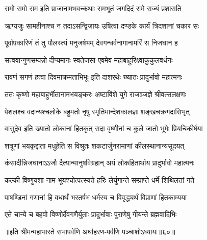 \twolineshloka
{रामो रामो राम इति प्राजानामभवन्कथाः}
{रामभूतं जगदिदं रामे राज्यं प्रशासति}


\twolineshloka
{ऋग्यजुः सामहीनाश्च न तदाऽसन्द्विजायः}
{उषित्वा दण्डके कार्यं त्रिदशानां चकार सः}


\twolineshloka
{पूर्वापकारिणं तं तु पौलस्त्यं मनुजर्षभम्}
{देवगन्धर्वनागानामरिं स निजघान ह}


\twolineshloka
{सत्ववान्गुणसम्पन्नो दीप्यमानः स्वतेजसा}
{एवमेव महाबाहुरिक्ष्वाकुकुलवर्धनः}


\twolineshloka
{रावणं सगणं हत्वा दिवमाक्रमताभिभूः}
{इति दाशरथेः ख्यातः प्रादुर्भावो महात्मनः}


\twolineshloka
{ततः कृष्णो महाबाहुर्भीतानामभयङ्करः}
{अष्टाविंशे युगे राजञ्जज्ञे श्रीवत्सलक्षणः}


\twolineshloka
{पेशलश्च वदान्यश्चलोके बहुमतो नृषु}
{स्मृतिमान्देशकालज्ञः शङ्खचक्रगदासिभृत्}


\twolineshloka
{वासुदेव इति ख्यातो लोकानां हितकृत् सदा}
{वृष्णीनां च कुले जातो भूमेः प्रियचिकीर्षया}


\twolineshloka
{शत्रूणां भयकृद्दाता मधुहेति स विश्रुतः}
{शकटार्जुनरामाणां कीलस्थानान्यसूदयत्}


\twolineshloka
{कंसादीन्निजघानाऽऽजौ दैत्यान्मानुषविग्रहान्}
{अयं लोकहितार्थाय प्रादुर्भावो महात्मनः}


\twolineshloka
{कल्की विष्णुयशा नाम भूयश्चोत्पत्स्यते हरिः}
{लेर्युगान्ते सम्प्राप्ते धर्मे शिथिलतां गते}


\twolineshloka
{पाषण्डिनां गणानां हि वधार्थं भरतर्षभ}
{धर्मस्य च विवृद्ध्यर्थं विप्राणां हितकाम्यया}


\twolineshloka
{एते चान्ये च बहवो विष्णोर्देवगणैर्युताः}
{प्रादुर्भावाः पुराणेषु गीयन्ते ब्रह्मवादिभिः}


॥इति श्रीमन्महाभारते सभापर्वणि अर्घाहरण-पर्वणि पञ्चाशोऽध्यायः॥६०॥

\closesection